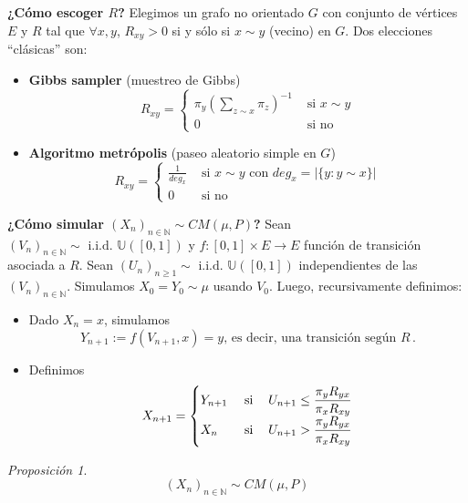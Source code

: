 \documentclass[letterpaper,11pt]{article} %
\def\espacio{\hspace{.25cm}\,}
\theoremstyle{defbreak}
\theoremstyle{propbreak}
\theoremstyle{remark}
\theoremstyle{break}
\newtheorem{proposition}{Proposición}[subsection]
\def\N{\mathbb{N}}
\def\unif{\mathbb{U}([0,1])}
\def\iid{\mbox{ i.i.d. }}
\begin{document}
\newp \textbf{¿Cómo escoger $R$?}
\newline Elegimos un grafo no orientado $G$ con conjunto de vértices $E$ y  $R$ tal que $\forall x,y$, $R_{xy}>0$ si y sólo si $x \sim y$ (vecino) en $G$.
\newline Dos elecciones ``clásicas'' son:
\begin{itemize}
    \item \textbf{Gibbs sampler} (muestreo de Gibbs)
    $$ R_{xy}=\begin{cases}
    \pi_{y}(\displaystyle\sum_{z\sim x}\pi_z)^{-1}  & \mbox{ si }x\sim y\\
    0  & \mbox{ si no}
    \end{cases}$$
    \item \textbf{Algoritmo metrópolis} (paseo aleatorio simple en $G$)
    $$ R_{xy}=\begin{cases}
    \displaystyle\frac{1}{deg_x} & \mbox{ si }x\sim y\mbox{ con }deg_x=|\{y:y\sim x\}|\\
    0  & \mbox{ si no}
    \end{cases}$$
\end{itemize}
\label{m-h}
\textbf{¿Cómo simular $(X_n)_{n\in\N}\sim CM(\mu,P)$?}
\newline Sean $(V_n)_{n\in\N}\sim\iid \unif$ y $f:[0,1]\times E\to E$ función de transición asociada a $R$.
\newline Sean $(U_n)_{n\geq 1}\sim \iid\unif$ independientes de las $(V_n)_{n\in\N}$. Simulamos $X_0=Y_0\sim\mu$ usando $V_0$.
\newline Luego, recursivamente definimos:
\begin{itemize}
    \item Dado $X_n=x$, simulamos
    $$ Y_{n+1}:=f(V_{n+1},x)=y \mbox{, es decir, una transición según }R\,.$$
    \item Definimos
    $$ X_{n+1}=\begin{cases}
    Y_{n+1}  & \mbox{ si } \espacio U_{n+1}\leq \displaystyle\frac{\pi_y R_{yx}}{\pi_x R_{xy}}  \\
    X_n  & \mbox{ si } \espacio U_{n+1}> \displaystyle\frac{\pi_y R_{yx}}{\pi_x R_{xy}}
    \end{cases}$$
\end{itemize}
\begin{proposition}
$$ (X_n)_{n\in\N}\sim CM(\mu,P)$$
\end{proposition}
\end{document}
